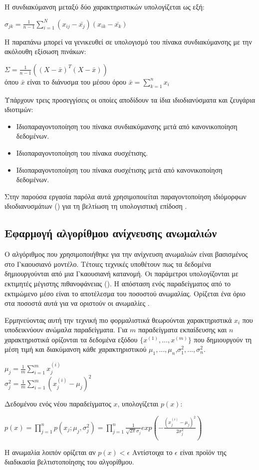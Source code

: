 Η συνδιακύμανση μεταξύ δύο χαρακτηριστικών υπολογίζεται ως εξή:
\begin{center}
$\sigma_{jk}=\frac{1}{n-1}\sum_{i=1}^N(x_{ij}-\bar{x_j})(x_{ik}-\bar{x_k})$
\end{center}
Η παραπάνω μπορεί να γενικευθεί σε υπολογισμό του πίνακα συνδιακύμανσης με την ακόλουθη εξίσωση πινάκων:
\begin{center}
$\Sigma=\frac{1}{n-1}((X-\bar{x})^T(X-\bar{x}))$\\
όπου $\bar{x}$ είναι το διάνυσμα του μέσου όρου $\bar{x}=\sum_{k=1}^nx_i$
\end{center}
Υπάρχουν τρεις προσεγγίσεις οι οποίες αποδίδουν τα ίδια ιδιοδιανύσματα και ζευγάρια ιδιοτιμών:
\begin{itemize}
\item Ιδιοπαραγοντοποίηση του πίνακα συνδιακύμανσης μετά από κανονικοποίηση δεδομένων.
\item Ιδιοπαραγοντοποίηση του πίνακα συσχέτισης.
\item Ιδιοπαραγοντοποίηση του πίνακα συσχέτισης μετά από κανονικοποίηση δεδομένων.
\end{itemize}
Στην παρούσα εργασία παρόλα αυτά χρησιμοποιείται παραγοντοποίηση ιδιόμορφων ιδιοδιανυσμάτων () για τη βελτίωση τη υπολογιστική επίδοση \cite{Plotly}.
\subsection{Εφαρμογή αλγορίθμου ανίχνευσης ανωμαλιών}
Ο αλγόριθμος που χρησιμοποιήθηκε για την ανίχνευση ανωμαλιών είναι βασισμένος στο Γκαουσιανό μοντέλο. Τέτοιες τεχνικές υποθέτουν πως τα δεδομένα δημιουργούνται από μια Γκαουσιανή κατανομή. Οι παράμετροι υπολογίζονται με εκτιμητές μέγιστης πιθανοφάνειας (). Η απόσταση ενός παραδείγματος από το εκτιμώμενο μέσο είναι το αποτέλεσμα του ποσοστού ανωμαλίας. Ορίζεται ένα όριο στα ποσοστά αυτά για να οριστούν οι ανωμαλίες \cite{Anomaly}.\par
Ερμηνεύοντας αυτή την τεχνική πιο φορμαλιστικά θεωρούνται χαρακτηριστικά $x_i$ που υποδεικνύουν ανώμαλα παραδείγματα. Για $m$ παραδείγματα εκπαίδευσης και $n$ χαρακτηριστικά ορίζονται τα δεδομένα εξόδου $\{x^{(1)}, ...,x^{(m)}\}$ που δημιουργούν τη μέση τιμή και διακύμανση κάθε χαρακτηριστικού $\mu_1, ...,\mu_n$,$\sigma_1^2, ..., \sigma_n^2 $.
\begin{center}
$\mu_j=\frac{1}{m}\sum_{i=1}^m x_j^{(i)}$\\ $\sigma_j^2=\frac{1}{m}\sum_{i=1}^m (x_j^{(i)} -\mu_j)^2$\\
\end{center}
Δεδομένου ενός νέου παραδείγματος $x$, υπολογίζεται $p(x)$:\\
\begin{center}
$p(x)=\prod_{j=1}^n p(x_j;\mu_j, \sigma_j^2)=\prod_{j=1}^n \frac{1}{\sqrt{2\pi}\sigma_j}exp(-\frac{(x_j^{(i)} -\mu_j)^2}{2\sigma_j^2})$
\end{center}
Η ανωμαλία λοιπόν ορίζεται αν $p(x)<\epsilon$
Αντίστοιχα το $\epsilon$ είναι προϊόν της διαδικασία βελτιστοποίησης του αλγορίθμου.
